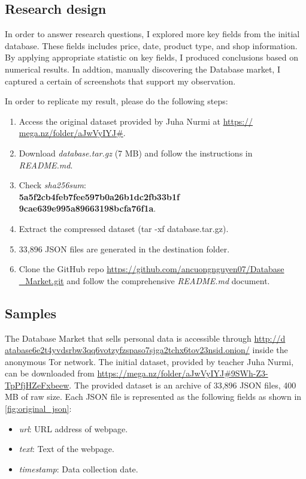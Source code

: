 \subsection{Research design}
In order to answer research questions, I explored more key fields from the initial
database. These fields includes price, date, product type, and shop information.
By applying appropriate statistic on key fields, I produced conclusions based on
numerical results. In addtion, manually discovering the Database market, I captured
a certain of screenshots that support my observation.

In order to replicate my result, please do the following steps:

\begin{enumerate}
    \item Access the original dataset provided by Juha Nurmi at \url{https://
    mega.nz/folder/aJwVyIYJ#}.
    \item Download \emph{database.tar.gz} (7 MB) and follow the instructions
    in \emph{README.md}.
    \item Check \emph{sha256sum}:\\\textbf{5a5f2cb4feb7fee597b0a26b1dc2fb33b1f
    9cae639e995a89663198bcfa76f1a}.
    \item Extract the compressed dataset (tar -xf database.tar.gz).
    \item 33,896 JSON files are generated in the destination folder.
    \item Clone the GitHub repo \url{https://github.com/ancuongnguyen07/Database
    _Market.git} and follow the comprehensive \emph{README.md} document.
\end{enumerate}

\subsection{Samples}
%
The Database Market that sells personal data is accessible through \url{http://d
atabase6e2t4yvdsrbw3qq6votzyfzspaso7sjga2tchx6tov23nsid.onion/} inside the
anonymous Tor network. The initial dataset, provided by teacher Juha Nurmi, can
be downloaded from \url{https://mega.nz/folder/aJwVyIYJ#9SWh-Z3-
TpPfjHZeFxbeew}.
The provided dataset is an archive of 33,896 JSON files, 400 MB of raw size. Each
JSON file is represented as the following fields as shown in \autoref{fig:original_json}:

\begin{itemize}
    \item \emph{url}: URL address of webpage.
    \item \emph{text}: Text of the webpage.
    \item \emph{timestamp}: Data collection date.
\end{itemize}

